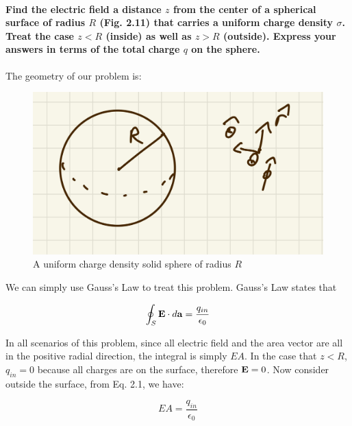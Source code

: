 \documentclass{article}
\numberwithin{equation}{section}
\numberwithin{figure}{section}
\begin{document}
\paragraph{Find the electric field a distance $z$ from the center of a spherical surface of radius $R$ (Fig. 2.11) that carries a uniform charge density $\sigma$. Treat the case $z < R$ (inside) as well as $z > R$ (outside). Express your answers in terms of the total charge $q$ on the sphere. \\}

The geometry of our problem is:

\begin{figure}[!htb]
    \centering
   \begin{minipage}{0.48\textwidth}
     \includegraphics[width=1\linewidth]{hw/hw2/2.1.jpg}
     \caption{A uniform charge density solid sphere of radius $R$}
   \end{minipage}
\end{figure}

We can simply use Gauss's Law to treat this problem. Gauss's Law states that

\begin{equation}
    \oint_S \vb{E} \cdot d \vb{a} = \frac{q_{in}}{\epsilon_0}
\end{equation}

In all scenarios of this problem, since all electric field and the area vector are all in the positive radial direction, the integral is simply $E A$. In the case that $z < R$, $q_{in} = 0$ because all charges are on the surface, therefore $\vb{E} = 0$. Now consider outside the surface, from Eq. 2.1, we have:

\begin{equation}
    EA = \frac{q_{in}}{\epsilon_0}
\end{equation}
\end{document}

